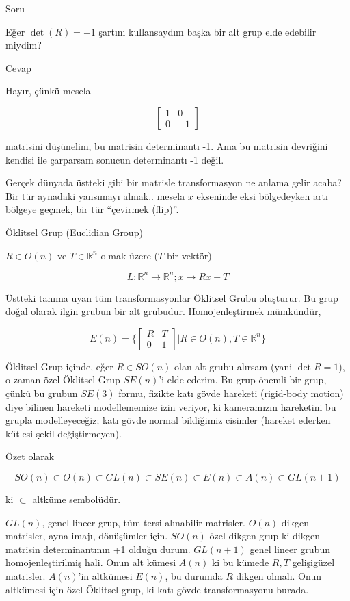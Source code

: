 \documentclass[12pt,fleqn]{article}\usepackage{../../common}
\begin{document}
Soru

Eğer $\det(R) = -1$ şartını kullansaydım başka bir alt grup elde edebilir
miydim? 

Cevap

Hayır, çünkü mesela 

$$ 
\left[\begin{array}{rrr}
1 & 0 \\ 0 & -1
\end{array}\right]
 $$

matrisini düşünelim, bu matrisin determinantı -1. Ama bu matrisin devriğini
kendisi ile çarparsam sonucun determinantı -1 değil.

Gerçek dünyada üstteki gibi bir matrisle transformasyon ne anlama gelir
acaba? Bir tür aynadaki yansımayı almak.. mesela $x$ ekseninde eksi
bölgedeyken artı bölgeye geçmek, bir tür ``çevirmek (flip)''. 

Öklitsel Grup (Euclidian Group)

$R \in O(n)$ ve $T \in \mathbb{R}^n$ olmak üzere ($T$ bir vektör)

$$ L: \mathbb{R}^n \to \mathbb{R}^n; x \to Rx + T $$

Üstteki tanıma uyan tüm transformasyonlar Öklitsel Grubu oluşturur. Bu grup
doğal olarak ilgin grubun bir alt grubudur. Homojenleştirmek mümkündür, 

$$ E(n) = 
\bigg\{
\left[\begin{array}{rrr}
R & T \\ 0 & 1
\end{array}\right]
\bigg |
R \in O(n), T \in \mathbb{R}^n
\bigg\}
 $$

Öklitsel Grup içinde, eğer $R \in SO(n)$ olan alt grubu alırsam (yani
$\det R = 1$), o zaman özel Öklitsel Grup $SE(n)$'i elde ederim. Bu grup
önemli bir grup, çünkü bu grubun $SE(3)$ formu, fizikte katı gövde
hareketi (rigid-body motion) diye bilinen hareketi modellememize izin
veriyor, ki kameramızın hareketini bu grupla modelleyeceğiz; katı gövde
normal bildiğimiz cisimler (hareket ederken kütlesi şekil değiştirmeyen).

Özet olarak 

$$ SO(n) \subset O(n) 
\subset GL(n)
\subset SE(n) 
\subset E(n)
\subset A(n) 
\subset GL(n+1)
$$

ki $\subset$ altküme sembolüdür.

$GL(n)$, genel lineer grup, tüm tersi alınabilir matrisler. $O(n)$ dikgen
matrisler, ayna imajı, dönüşümler için. $SO(n)$ özel dikgen grup ki dikgen
matrisin determinantının +1 olduğu durum. $GL(n+1)$ genel lineer grubun
homojenleştirilmiş hali. Onun alt kümesi $A(n)$ ki bu kümede $R,T$
gelişigüzel matrisler. $A(n)$'in altkümesi $E(n)$, bu durumda $R$ dikgen
olmalı. Onun altkümesi için özel Öklitsel grup, ki katı gövde
transformasyonu burada. 
\end{document}
